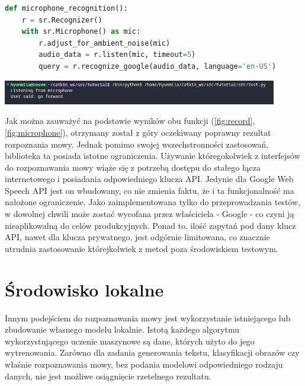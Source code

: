 \begin{lstlisting}[language=Python]
def microphone_recognition():
    r = sr.Recognizer()
    with sr.Microphone() as mic:
        r.adjust_for_ambient_noise(mic)
        audio_data = r.listen(mic, timeout=5)
        query = r.recognize_google(audio_data, language='en-US')
\end{lstlisting}

\begin{center}
    \includegraphics[width=12cm]{files/microphon1.png}
    \label{fig:microphone}
\end{center}

Jak można zauważyć na podstawie wyników obu funkcji (\ref{fig:record}, \ref{fig:microphone}), otrzymany został z góry oczekiwany poprawny rezultat rozpoznania mowy. Jednak pomimo swojej wszechstronności zastosowań, biblioteka ta posiada istotne ograniczenia. Używanie któregokolwiek z interfejsów do rozpoznawania mowy wiąże się z potrzebą dostępu do stałego łącza internetowego i posiadania odpowiedniego klucza API. Jedynie dla Google Web Speech API jest on wbudowany, co nie zmienia faktu, że i ta funkcjonalność ma nałożone ograniczenie. Jako zaimplementowana tylko do przeprowadzania testów, w dowolnej chwili może zostać wycofana przez właściciela - Google - co czyni ją nieaplikowalną do celów produkcyjnych. Ponad to, ilość zapytań pod dany klucz API, nawet dla klucza prywatnego, jest odgórnie limitowana, co znacznie utrudnia zastosowanie którejkolwiek z metod poza środowiskiem testowym.


\section{Środowisko lokalne}
\label{sec:srodLocal}

Innym podejściem do rozpoznawania mowy jest wykorzystanie istniejącego lub zbudowanie własnego modelu lokalnie. Istotą każdego algorytmu wykorzystującego uczenie maszynowe są dane, których użyto do jego wytrenowania. Zarówno dla zadania generowania tekstu, klasyfikacji obrazów czy właśnie rozpoznawania mowy, bez podania modelowi odpowiedniego rodzaju danych, nie jest możliwe osiągnięcie rzetelnego rezultatu. 

